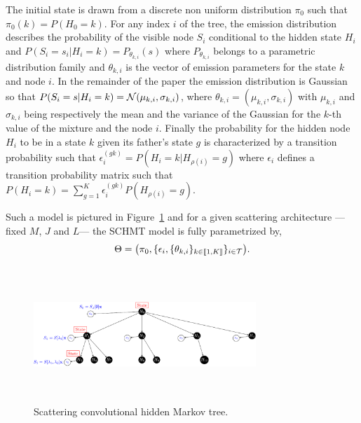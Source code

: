 \documentclass{article}
\begin{document}
    The initial state is drawn from a discrete non uniform distribution $\pi_{0}$ such that $\pi_{0}(k) = P(H_{0}=k)$.
    For any index $i$ of the tree, the emission distribution describes the probability of the visible node $S_{i}$ conditional to the hidden state $H_{i}$ and $P(S_{i}=s_{i}|H_{i}=k) = P_{\theta_{k,i}}(s)$ where $P_{\theta_{k,i}}$ belongs to a parametric distribution family and $\theta_{k,i}$ is the vector of emission parameters for the state $k$ and node $i$. In the remainder of the paper the emission distribution is Gaussian so that $P(S_{i}=s | H_{i}=k) = \mathcal{N}(\mu_{k,i},\sigma_{k,i})$, where $\theta_{k,i}=(\mu_{k,i},\sigma_{k,i})$ with $\mu_{k,i}$ and $\sigma_{k,i}$ being respectively the mean and the variance of the Gaussian for the $k$-th value of the mixture and the node $i$.
    Finally the probability for the hidden node $H_{i}$ to be in a state $k$ given its father's state $g$ is characterized by a transition probability such that $\epsilon_{i}^{(gk)} = P(H_{i}= k | H_{\rho(i)}=g)$ where $\epsilon_{i}$ defines a transition probability matrix such that $P(H_{i}=k) = \sum_{g=1}^{K} \epsilon_{i}^{(gk)} P(H_{\rho(i)}=g)$.

    Such a model is pictured in Figure~\ref{fig:SCHMT 1} and for a given scattering architecture ---\ie fixed $M$, $J$ and $L$--- the SCHMT model is fully parametrized by,
    \vspace{-5pt}
    \begin{equation}
      \Theta = \big(\pi_{0}, \{ \epsilon_{i}, \{ \theta_{k,i} \}_{k\in\llbracket1,K\rrbracket} \}_{i\in\mathcal{T}}\big).
      \label{eq:SCHMT - parameters}
    \end{equation}
    \vspace{-15pt}

    \begin{figure}
      \begin{center}
        \includegraphics[width=3.3in, height=2in, keepaspectratio]{scat_HMT_crop.pdf}
        \caption{Scattering convolutional hidden Markov tree.}
        \label{fig:SCHMT 1}
      \end{center}
    \end{figure}
\end{document}
